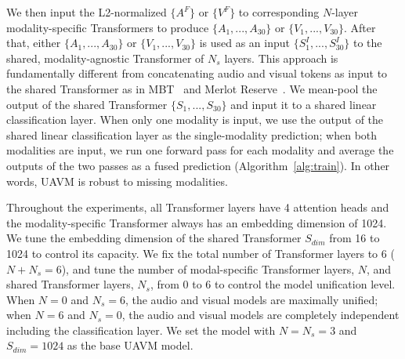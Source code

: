 \documentclass[journal]{IEEEtran}
\begin{document}
We then input the L2-normalized $\{A^F\}$ or $\{V^F\}$ to corresponding $N$-layer modality-specific Transformers to produce $\{A_1, ..., A_{30}\}$ or $\{V_1, ..., V_{30}\}$. After that, either $\{A_1, ..., A_{30}\}$ or $\{V_1, ..., V_{30}\}$ is used as an input $\{S^I_1, ..., S^I_{30}\}$ to the shared, modality-agnostic Transformer of $N_s$ layers. This approach is fundamentally different from concatenating audio and visual tokens as input to the shared Transformer as in MBT~\cite{nagrani2021attention} and Merlot Reserve~\cite{zellers2022merlot}. We mean-pool the output of the shared Transformer $\{S_1, ..., S_{30}\}$ and input it to a shared linear classification layer. When only one modality is input, we use the output of the shared linear classification layer as the single-modality prediction; when both modalities are input, we run one forward pass for each modality and average the outputs of the two passes as a fused prediction (Algorithm~\ref{alg:train}). In other words, UAVM is robust to missing modalities.

Throughout the experiments, all Transformer layers have 4 attention heads and the modality-specific Transformer always has an embedding dimension of 1024. We tune the embedding dimension of the shared Transformer $S_{dim}$ from 16 to 1024 to control its capacity. We fix the total number of Transformer layers to 6 ($N + N_s=6$), and tune the number of modal-specific Transformer layers, $N$, and shared Transformer layers, $N_s$, from 0 to 6 to control the model unification level. When $N=0$ and $N_s=6$, the audio and visual models are maximally unified; when $N=6$ and $N_s=0$, the audio and visual models are completely independent including the classification layer. We set the model with $N=N_s=3$ and $S_{dim}=1024$ as the base UAVM model. 
\end{document}
